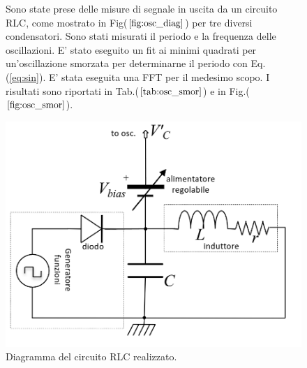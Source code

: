 \documentclass{article}
\begin{document}
        
        \begin{figure}[H]
            \begin{minipage}{0.45\textwidth}
                Sono state prese delle misure di segnale in uscita da un circuito RLC,
                come mostrato in Fig($\ref{fig:osc_diag}$) per tre diversi condensatori.
                Sono stati misurati il periodo e la frequenza delle oscillazioni.
                E' stato eseguito un fit ai minimi quadrati per un'oscillazione 
                smorzata per determinarne il periodo con Eq.(\ref{eq:sin}).
                E' stata eseguita una FFT per il medesimo scopo.
                I risultati sono riportati in Tab.($\ref{tab:osc_smor}$) e 
                in Fig.($\ref{fig:osc_smor}$).
            \end{minipage}%
            \hfill
            \begin{minipage}{0.45\textwidth}
                \includegraphics[width=\textwidth]{FFT12/RLCdiagram.png}
                \caption{Diagramma del circuito RLC realizzato.}
                \label{fig:osc_diag}
            \end{minipage}
        \end{figure}
\end{document}

